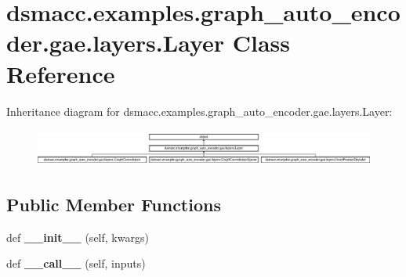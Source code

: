 \hypertarget{classdsmacc_1_1examples_1_1graph__auto__encoder_1_1gae_1_1layers_1_1Layer}{}\section{dsmacc.\+examples.\+graph\+\_\+auto\+\_\+encoder.\+gae.\+layers.\+Layer Class Reference}
\label{classdsmacc_1_1examples_1_1graph__auto__encoder_1_1gae_1_1layers_1_1Layer}
Inheritance diagram for dsmacc.\+examples.\+graph\+\_\+auto\+\_\+encoder.\+gae.\+layers.\+Layer\+:\begin{figure}[H]
\begin{center}
\leavevmode
\includegraphics[height=1.241685cm]{classdsmacc_1_1examples_1_1graph__auto__encoder_1_1gae_1_1layers_1_1Layer}
\end{center}
\end{figure}
\subsection*{Public Member Functions}
\begin{DoxyCompactItemize}
\item 
\mbox{\label{classdsmacc_1_1examples_1_1graph__auto__encoder_1_1gae_1_1layers_1_1Layer_a7264d88141282e4717cfbf43177b3a10}} 
def {\bfseries \+\_\+\+\_\+init\+\_\+\+\_\+} (self, kwargs)
\item 
\mbox{\label{classdsmacc_1_1examples_1_1graph__auto__encoder_1_1gae_1_1layers_1_1Layer_af0d68c89ed934c58b601daa28f90cf45}} 
def {\bfseries \+\_\+\+\_\+call\+\_\+\+\_\+} (self, inputs)
\end{DoxyCompactItemize}
